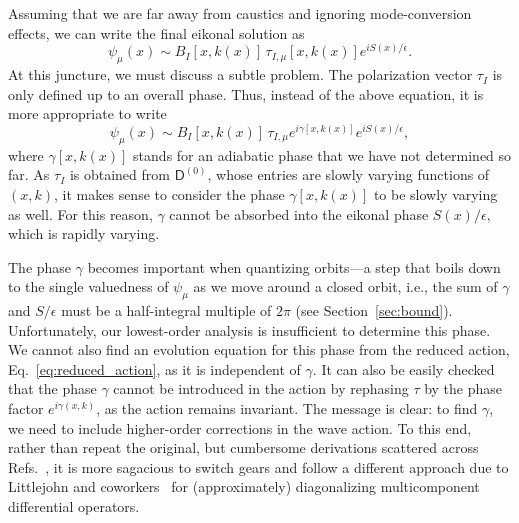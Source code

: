 Assuming that we are far away from caustics and ignoring mode-conversion effects, we can write the final eikonal solution as
%
\begin{equation}
  \psi_{\mu}(x) \sim B_{I}[x, k(x)]\,\tau_{I,\mu}[x, k(x)]e^{iS(x)/\epsilon}.
  \label{eq:psi_wkb_wrong}
\end{equation}
%
At this juncture, we must discuss a subtle problem.
The polarization vector $\tau_{I}$ is only defined up to an overall phase.
Thus, instead of the above equation, it is more appropriate to write
%
\begin{equation}
  \psi_{\mu}(x) \sim B_{I}[x, k(x)]\,\tau_{I,\mu}e^{i\gamma[x, k(x)]}e^{iS(x)/\epsilon},
\end{equation}
%
where $\gamma[x, k(x)]$ stands for an adiabatic phase that we have not determined so far.
As $\tau_{I}$ is obtained from $\mathsf{D}^{(0)}$, whose entries are slowly varying functions of $(x, k)$, it makes sense to consider the phase $\gamma[x, k(x)]$ to be slowly varying as well.
For this reason, $\gamma$ cannot be absorbed into the eikonal phase $S(x)/\epsilon$, which is rapidly varying.

The phase $\gamma$ becomes important when quantizing orbits---a step that boils down to the single valuedness of $\psi_{\mu}$ as we move around a closed orbit, i.e., the sum of $\gamma$ and $S/\epsilon$ must be a half-integral multiple of $2\pi$ (see Section~\ref{sec:bound}).
Unfortunately, our lowest-order analysis is insufficient to determine this phase.
We cannot also find an evolution equation for this phase from the reduced action, Eq.~\eqref{eq:reduced_action}, as it is independent of $\gamma$.
It can also be easily checked that the phase $\gamma$ cannot be introduced in the action by rephasing $\tau$ by the phase factor $e^{i\gamma(x,k)}$, as the action remains invariant.
The message is clear: to find $\gamma$, we need to include higher-order corrections in the wave action.
To this end, rather than repeat the original, but cumbersome derivations scattered across Refs.~\cite{bernstein1975,berk1980,yabana1986,kaufman1987}, it is more sagacious to switch gears and follow a different approach due to Littlejohn and coworkers~\cite{littlejohn1991,littlejohn1991a} for (approximately) diagonalizing multicomponent differential operators.


